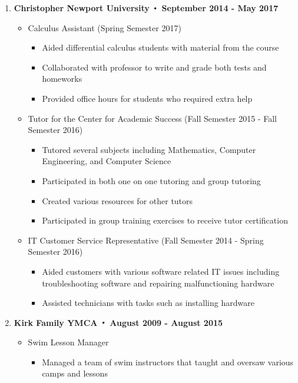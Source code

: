 \begin{enumerate}[label={\Roman*}.]
	\item \textbf{Christopher Newport University $\Bigcdot$ September 2014 - May 2017}
	      \begin{itemize}
	      	\item Calculus Assistant (Spring Semester 2017)
            \begin{itemize}
                \item Aided differential calculus students with material from the course
                \item Collaborated with professor to write and grade both tests and homeworks
                \item Provided office hours for students who required extra help
            \end{itemize}

	      	\item Tutor for the Center for Academic Success (Fall Semester 2015 - Fall Semester 2016)
	      	      \begin{itemize}
	      	      	\item Tutored several subjects including Mathematics, Computer Engineering, and Computer Science
	      	      	\item Participated in both one on one tutoring and group tutoring
	      	      	\item Created various resources for other tutors
	      	      	\item Participated in group training exercises to receive tutor certification
	      	      \end{itemize}
	      	\item IT Customer Service Representative (Fall Semester 2014 - Spring Semester 2016)
	      	      \begin{itemize}
	      	      	\item Aided customers with various software related IT issues including troubleshooting software and repairing malfunctioning hardware
	      	      	\item Assisted technicians with tasks such as installing hardware
	      	      \end{itemize}
	      \end{itemize}
	\item \textbf{Kirk Family YMCA $\Bigcdot$ August 2009 - August 2015}
	      \begin{itemize}
	      	\item Swim Lesson Manager
	      	      \begin{itemize}
	      	      	\item Managed a team of swim instructors that taught and oversaw various camps and lessons

\end{itemize}
\end{itemize}
\end{enumerate}
